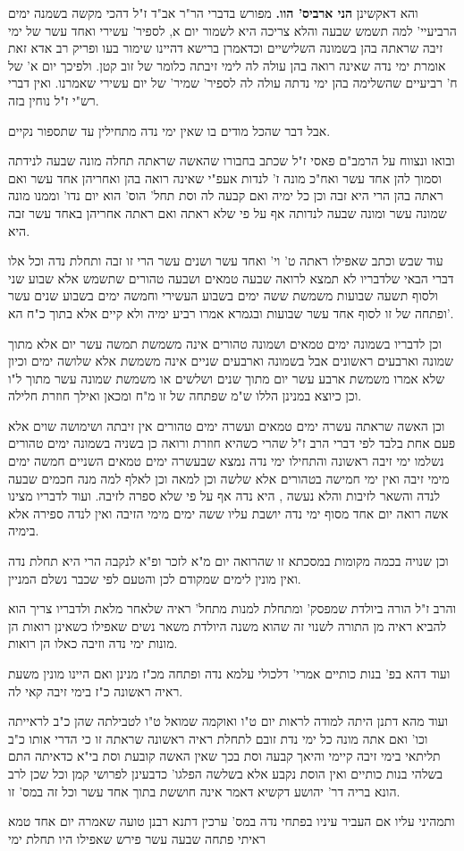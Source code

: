 \documentclass[12pt, openany]{book}
\begin{document}
{והא דאקשינן \textbf{הני ארביס' הוו.}  מפורש בדברי הר"ר אב"ד ז"ל דהכי מקשה בשמנה ימים הרביעיי' למה תשמש שבעה והלא צריכה היא לשמור יום א, לספיר' עשירי ואחד עשר של ימי זיבה שראתה בהן בשמונה השלישיים וכדאמרן ברישא דהיינו שימור בעו ופריק רב אדא זאת אומרת ימי נדה שאינה רואה בהן עולה לה לימי זיבתה כלומר של זוב קטן. ולפיכך יום א' של ח' רביעיים שהשלימה בהן ימי נדתה עולה לה לספיר' שמיר' של יום עשירי שאמרנו. ואין דברי רש"י ז"ל נוחין בזה.\par  אבל דבר שהכל מודים בו שאין ימי נדה מתחילין עד שתספור נקיים.\par  ובואו ונצווח על הרמב"ם פאסי ז"ל שכתב בחבורו שהאשה שראתה תחלה מונה שבעה לנידתה וסמוך להן אחד עשר ואח"כ מונה ז' לנדות אעפ"י שאינה רואה בהן ואחריהן אחד עשר ואם ראתה בהן הרי היא זבה וכן כל ימיה ואם קבעה לה וסת תחל' הוס' הוא יום נדו' וממנו מונה שמונה עשר ומונה שבעה לנדותה אף על פי שלא ראתה ואם ראתה אחריהן באחד עשר זבה היא.\par עוד שבש וכתב שאפילו ראתה ט' וי' ואחד עשר ושנים עשר הרי זו זבה ותחלת נדה וכל אלו דברי הבאי שלדבריו לא תמצא לרואה שבעה טמאים ושבעה טהורים שתשמש אלא שבוע שני ולסוף תשעה שבועות משמשת ששה ימים בשבוע העשירי וחמשה ימים בשבוע שנים עשר ופתחה של זו לסוף אחד עשר שבועות ובגמרא אמרו רביע ימיה ולא קיים אלא בתוך כ"ח הא'.\par  וכן לדבריו בשמונה ימים טמאים ושמונה טהורים אינה משמשת תמשה עשר יום אלא מתוך שמונה וארבעים ראשונים אבל בשמונה וארבעים שניים אינה משמשת אלא שלושה ימים וכיון שלא אמרו משמשת ארבע עשר יום מתוך שנים ושלשים או משמשת שמונה עשר מתוך ל"ו וכן כיוצא במנינן הללו ש"מ שפתחה של זו מ"ח ומכאן ואילך חוזרת חלילה.\par וכן האשה שראתה עשרה ימים טמאים ועשרה ימים טהורים אין זיבתה ושימושה שוים אלא פעם אחת בלבד לפי דברי הרב ז"ל שהרי כשהיא חוזרת ורואה כן בשניה בשמונה ימים טהורים נשלמו ימי זיבה ראשונה והתחילו ימי נדה נמצא שבעשרה ימים טמאים השניים חמשה ימים מימי זיבה ואין ימי חמישה בטהורים אלא שלשה וכן למאה וכן לאלף למה מנה חכמים שבעה לנדה והשאר לזיבות והלא נעשה , היא נדה אף על פי שלא ספרה לזיבה. ועוד לדבריו מצינו אשה רואה יום אחד מסוף ימי נדה יושבת עליו ששה ימים מימי הזיבה ואין לנדה ספירה אלא בימיה.\par וכן שנויה בכמה מקומות במסכתא זו שהרואה יום מ"א לזכר ופ"א לנקבה הרי היא תחלת נדה ואין מונין לימים שמקודם לכן והטעם לפי שכבר נשלם המניין.\par והרב ז"ל הורה ביולדת שמפסק' ומתחלת למנות מתחל' ראיה שלאחר מלאת ולדבריו צריך הוא להביא ראיה מן התורה לשנוי זה שהוא משנה היולדת משאר נשים שאפילו כשאינן רואות הן מונות ימי נדה וזיבה כאלו הן רואות.\par ועוד דהא בפ' בנות כותיים אמרי' דלכולי עלמא נדה ופתחה מכ"ז מנינן ואם היינו מונין משעת ראיה ראשונה כ"ז בימי זיבה קאי לה.\par  ועוד מהא דתנן היתה למודה לראות יום ט"ו ואוקמה שמואל ט"ו לטבילתה שהן כ"ב לראייתה וכו' ואם אתה מונה כל ימי נדת זובם לתחלת ראיה ראשונה שראתה זו כי הדרי אותו כ"ב תליתאי בימי זיבה קיימי והיאך קבעה וסת בכך שאין האשה קובעת וסת בי"א כדאיתה התם בשלהי בנות כותיים ואין הוסת נקבע אלא בשלשה הפלגו' כדבעינן לפרושי קמן וכל שכן לרב הונא בריה דר' יהושע דקשיא דאמר אינה חוששת בתוך אחד עשר וכל זה במס' זו.\par ותמהיני עליו אם העביר עיניו בפתחי נדה במס' ערכין דתנא רבנן טועה שאמרה יום אחד טמא ראיתי פתחה שבעה עשר פירש שאפילו היו תחלת ימי }
\end{document}
